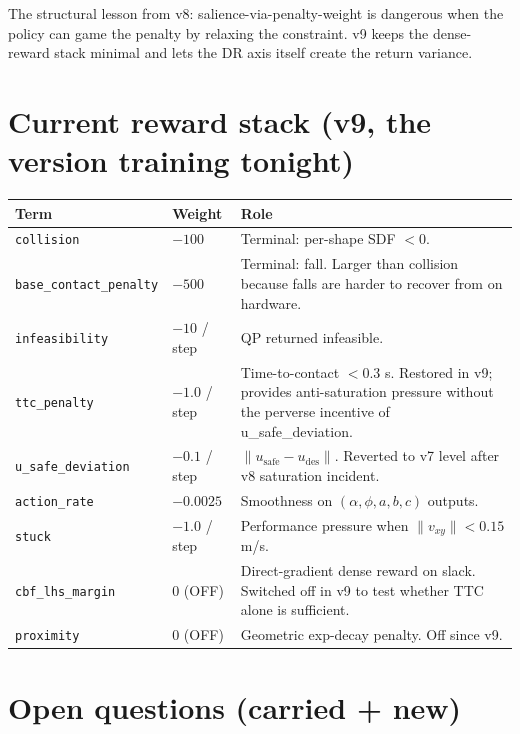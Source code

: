 \documentclass[11pt]{article}
\begin{document}
The structural lesson from v8: salience-via-penalty-weight is dangerous when the policy can game the penalty by relaxing the constraint. v9 keeps the dense-reward stack minimal and lets the DR axis itself create the return variance.

\section*{Current reward stack (v9, the version training tonight)}

\begin{center}
\begin{tabular}{@{}l l p{2.8in}@{}}
\toprule
Term & Weight & Role \\
\midrule
\texttt{collision}                & $-100$         & Terminal: per-shape SDF $< 0$. \\
\texttt{base\_contact\_penalty}   & $-500$         & Terminal: fall. Larger than collision because falls are harder to recover from on hardware. \\
\texttt{infeasibility}            & $-10$ / step   & QP returned infeasible. \\
\texttt{ttc\_penalty}             & $-1.0$ / step  & Time-to-contact $< 0.3$ s. Restored in v9; provides anti-saturation pressure without the perverse incentive of u\_safe\_deviation. \\
\texttt{u\_safe\_deviation}       & $-0.1$ / step  & $\|u_\text{safe} - u_\text{des}\|$. Reverted to v7 level after v8 saturation incident. \\
\texttt{action\_rate}             & $-0.0025$      & Smoothness on $(\alpha, \phi, a, b, c)$ outputs. \\
\texttt{stuck}                    & $-1.0$ / step  & Performance pressure when $\|v_{xy}\| < 0.15$ m/s. \\
\texttt{cbf\_lhs\_margin}         & $0$ (OFF)      & Direct-gradient dense reward on slack. Switched off in v9 to test whether TTC alone is sufficient. \\
\texttt{proximity}                & $0$ (OFF)      & Geometric exp-decay penalty. Off since v9. \\
\bottomrule
\end{tabular}
\end{center}

\section*{Open questions (carried + new)}
\end{document}
